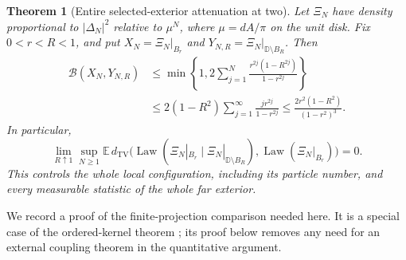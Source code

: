 \documentclass[11pt]{article}
\newtheorem{theorem}{Theorem}[section]
\theoremstyle{remark}\newtheorem{remark}[theorem]{Remark}
\begin{document}
\begin{theorem}[Entire selected-exterior attenuation at two]
\label{thm:full-exterior-beta-two}
Let $\Xi_N$ have density proportional to $|\Delta_N|^2$ relative to
$\mu^N$, where $\mu=dA/\pi$ on the unit disk.  Fix $0<r<R<1$, and put
$X_N=\Xi_N|_{B_r}$ and $Y_{N,R}=\Xi_N|_{\mathbb D\setminus B_R}$.
Then
\begin{align}
 \mathcal B(X_N,Y_{N,R})
 &\le \min\left\{1,
   2\sum_{j=1}^N
       \frac{r^{2j}(1-R^{2j})}{1-r^{2j}}\right\}
                                                        \label{eq:full-exterior-exact}\\
 &\le 2(1-R^2)\sum_{j=1}^{\infty}
                      \frac{j r^{2j}}{1-r^{2j}}
 \le \frac{2r^2(1-R^2)}{(1-r^2)^3}.
                                                        \label{eq:full-exterior-rate}
\end{align}
In particular,
\[
 \lim_{R\uparrow1}\sup_{N\ge1}
 \mathbb E\,d_{\mathrm{TV}}
  \bigl(\operatorname{Law}(\Xi_N|_{B_r}\mid
                    \Xi_N|_{\mathbb D\setminus B_R}),
                    \operatorname{Law}(\Xi_N|_{B_r})\bigr)=0.
\]
This controls the whole local configuration, including its particle
number, and every measurable statistic of the whole far exterior.
\end{theorem}

We record a proof of the finite-projection comparison needed here.
It is a special case of the ordered-kernel theorem
\cite[Theorem 3.8]{LyonsScreening}; its proof below removes any need
for an external coupling theorem in the quantitative argument.
\end{document}
